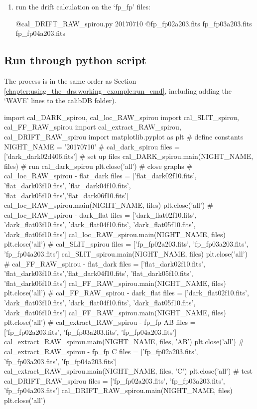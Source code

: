 \begin{enumerate}
\item run the drift calculation on the `fp\_fp' files:
\begin{cmdbox}
@cal_DRIFT_RAW_spirou.py 20170710 @fp_fp02a203.fits fp_fp03a203.fits fp_fp04a203.fits
\end{cmdbox}

\end{enumerate}

\clearpage
\newpage
\subsection{Run through python script}
\label{chapter:using_the_drs:working_example:run_python}

The process is in the same order as Section \ref{chapter:using_the_drs:working_example:run_cmd}, including adding the `WAVE' lines to the calibDB folder).

\begin{pythonbox}
import cal_DARK_spirou, cal_loc_RAW_spirou
import cal_SLIT_spirou, cal_FF_RAW_spirou
import cal_extract_RAW_spirou, cal_DRIFT_RAW_spirou
import matplotlib.pyplot as plt
# define constants
NIGHT_NAME = '20170710'
# cal_dark_spirou
files = ['dark_dark02d406.fits']          # set up files
cal_DARK_spirou.main(NIGHT_NAME, files)   # run cal_dark_spirou
plt.close('all')                          # close graphs
# cal_loc_RAW_spirou - flat_dark
files = ['flat_dark02f10.fits', 'flat_dark03f10.fits', 'flat_dark04f10.fits',
         'flat_dark05f10.fits','flat_dark06f10.fits']
cal_loc_RAW_spirou.main(NIGHT_NAME, files)
plt.close('all')
# cal_loc_RAW_spirou - dark_flat
files = ['dark_flat02f10.fits', 'dark_flat03f10.fits', 'dark_flat04f10.fits', 
         'dark_flat05f10.fits', 'dark_flat06f10.fits']
cal_loc_RAW_spirou.main(NIGHT_NAME, files)
plt.close('all')
# cal_SLIT_spirou
files = ['fp_fp02a203.fits', 'fp_fp03a203.fits', 'fp_fp04a203.fits']
cal_SLIT_spirou.main(NIGHT_NAME, files)
plt.close('all')
# cal_FF_RAW_spirou - flat_dark
files = ['flat_dark02f10.fits', 'flat_dark03f10.fits','flat_dark04f10.fits',
         'flat_dark05f10.fits', 'flat_dark06f10.fits']
cal_FF_RAW_spirou.main(NIGHT_NAME, files)
plt.close('all')
# cal_FF_RAW_spirou - dark_flat
files = ['dark_flat02f10.fits', 'dark_flat03f10.fits', 'dark_flat04f10.fits', 
         'dark_flat05f10.fits', 'dark_flat06f10.fits']
cal_FF_RAW_spirou.main(NIGHT_NAME, files)
plt.close('all')
# cal_extract_RAW_spirou - fp_fp AB
files = ['fp_fp02a203.fits', 'fp_fp03a203.fits', 'fp_fp04a203.fits']
cal_extract_RAW_spirou.main(NIGHT_NAME, files, 'AB')
plt.close('all')
# cal_extract_RAW_spirou - fp_fp C
files = ['fp_fp02a203.fits', 'fp_fp03a203.fits', 'fp_fp04a203.fits']
cal_extract_RAW_spirou.main(NIGHT_NAME, files, 'C')
plt.close('all')
# test cal_DRIFT_RAW_spirou
files = ['fp_fp02a203.fits', 'fp_fp03a203.fits', 'fp_fp04a203.fits']
cal_DRIFT_RAW_spirou.main(NIGHT_NAME, files)
plt.close('all')

\end{pythonbox}
